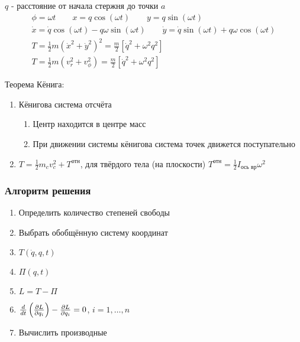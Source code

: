 \documentclass{article}
\begin{document}
\begin{eg}
  \phantom{.}

$q$ - расстояние от начала стержня до точки $a$
  \begin{gather*}
    \phi=\omega t \qquad x=q\cos(\omega t) \qquad y=q\sin(\omega t) \\ 
    \dot{x}=\dot{q}\cos(\omega t) - q \omega \sin(\omega t) \qquad
    \dot{y}=\dot{q}\sin(\omega t) + q \omega \cos(\omega t) \\ 
    T=\frac{1}{2}m(\dot{x}^{2}+\dot{y}^{2})^{2}=\frac{m}{2}[\dot{q}^{2}+\omega^{2}q^{2}] \\ 
    T=\frac{1}{2}m(v_r^{2}+v_{\phi}^{2})=\frac{m}{2}[\dot{q}^{2}+\omega^{2}q^{2}]
  \end{gather*}
\end{eg}
\begin{eg}
  \phantom{.}

  Теорема Кёнига:
  \begin{enumerate}
    \item Кёнигова система отсчёта
    \begin{enumerate}
      \item Центр находится в центре масс
      \item При движении системы кёнигова система точек движется поступательно
    \end{enumerate}
  \item $T=\frac{1}{2}m_cv_c^2+T^{\text{отн}}$, 
    для твёрдого тела (на плоскости) $T^{\text{отн}}=\frac{1}{2}I_{\text{ось вр}}\omega^{2}$
  \end{enumerate}
\end{eg}


\subsubsection{Алгоритм решения}
\begin{enumerate}
  \item Определить количество степеней свободы
  \item Выбрать обобщённую систему координат
  \item $T(\dot{q},q,t)$
  \item $\Pi(q,t)$
  \item $L=T-\Pi$
  \item $\frac{d}{dt}\left(\frac{\partial{L}}{\partial{q_i}}\right)-\frac{\partial{L}}{\partial{q_i}}=0$, $i=1,\dots ,n$
  \item Вычислить производные
\end{enumerate}
\end{document}
